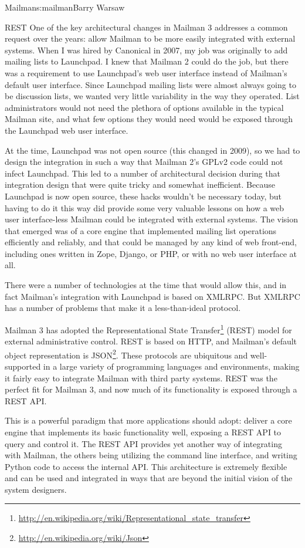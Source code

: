 \begin{aosachapter}{Mailman}{s:mailman}{Barry Warsaw}
\begin{aosasect1}{REST}
One of the key architectural changes in Mailman 3 addresses a common
request over the years: allow Mailman to be more easily integrated
with external systems.  When I was hired by Canonical in 2007, my job
was originally to add mailing lists to Launchpad.  I knew that Mailman
2 could do the job, but there was a requirement to use Launchpad's web
user interface instead of Mailman's default user interface.  Since
Launchpad mailing lists were almost always going to be discussion
lists, we wanted very little variability in the way they operated.
List administrators would not need the plethora of options available
in the typical Mailman site, and what few options they would need
would be exposed through the Launchpad web user interface.

At the time, Launchpad was not open source (this changed in 2009), so
we had to design the integration in such a way that Mailman 2's GPLv2
code could not infect Launchpad.  This led to a number of
architectural decision during that integration design that were quite
tricky and somewhat inefficient.  Because Launchpad is now open
source, these hacks wouldn't be necessary today, but having to do it
this way did provide some very valuable lessons on how a web user
interface-less Mailman could be integrated with external systems.  The
vision that emerged was of a core engine that implemented mailing list
operations efficiently and reliably, and that could be managed by any
kind of web front-end, including ones written in Zope, Django, or PHP,
or with no web user interface at all.

There were a number of technologies at the time that would allow this,
and in fact Mailman's integration with Launchpad is based on XMLRPC.
But XMLRPC has a number of problems that make it a less-than-ideal
protocol.

Mailman 3 has adopted the Representational State
Transfer\footnote{\url{http://en.wikipedia.org/wiki/Representational\_state\_transfer}}
(REST) model for external administrative control.  REST is based on
HTTP, and Mailman's default object representation is
JSON\footnote{\url{http://en.wikipedia.org/wiki/Json}}.  These
protocols are ubiquitous and well-supported in a large variety of
programming languages and environments, making it fairly easy to
integrate Mailman with third party systems.  REST was the perfect fit
for Mailman 3, and now much of its functionality is exposed through a
REST API.

This is a powerful paradigm that more applications should adopt:
deliver a core engine that implements its basic functionality well,
exposing a REST API to query and control it.  The REST API provides
yet another way of integrating with Mailman, the others being
utilizing the command line interface, and writing Python code to
access the internal API.  This architecture is extremely flexible and
can be used and integrated in ways that are beyond the initial vision
of the system designers.


\end{aosasect1}
\end{aosachapter}
